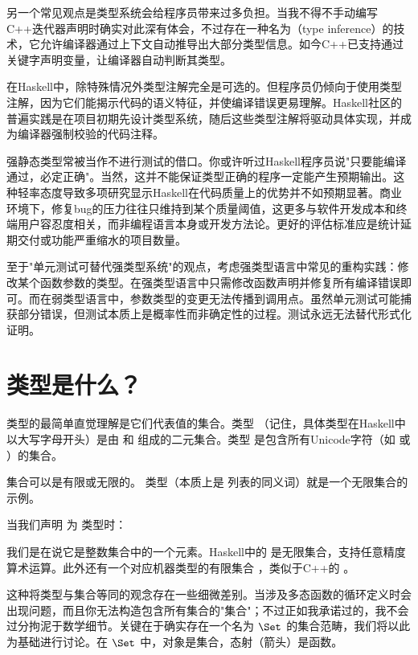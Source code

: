 另一个常见观点是类型系统会给程序员带来过多负担。当我不得不手动编写C++迭代器声明时确实对此深有体会，不过存在一种名为（type inference）的技术，它允许编译器通过上下文自动推导出大部分类型信息。如今C++已支持通过关键字声明变量，让编译器自动判断其类型。

在Haskell中，除特殊情况外类型注解完全是可选的。但程序员仍倾向于使用类型注解，因为它们能揭示代码的语义特征，并使编译错误更易理解。Haskell社区的普遍实践是在项目初期先设计类型系统，随后这些类型注解将驱动具体实现，并成为编译器强制校验的代码注释。\sloppy{}

强静态类型常被当作不进行测试的借口。你或许听过Haskell程序员说"只要能编译通过，必定正确"。当然，这并不能保证类型正确的程序一定能产生预期输出。这种轻率态度导致多项研究显示Haskell在代码质量上的优势并不如预期显著。商业环境下，修复bug的压力往往只维持到某个质量阈值，这更多与软件开发成本和终端用户容忍度相关，而非编程语言本身或开发方法论。更好的评估标准应是统计延期交付或功能严重缩水的项目数量。

至于"单元测试可替代强类型系统"的观点，考虑强类型语言中常见的重构实践：修改某个函数参数的类型。在强类型语言中只需修改函数声明并修复所有编译错误即可。而在弱类型语言中，参数类型的变更无法传播到调用点。虽然单元测试可能捕获部分错误，但测试本质上是概率性而非确定性的过程。测试永远无法替代形式化证明。

\section{类型是什么？}

类型的最简单直觉理解是它们代表值的集合。类型 （记住，具体类型在Haskell中以大写字母开头）是由  和  组成的二元集合。类型  是包含所有Unicode字符（如  或 ）的集合。

集合可以是有限或无限的。 类型（本质上是  列表的同义词）就是一个无限集合的示例。

当我们声明  为  类型时：

我们是在说它是整数集合中的一个元素。Haskell中的  是无限集合，支持任意精度算术运算。此外还有一个对应机器类型的有限集合 ，类似于C++的 。

这种将类型与集合等同的观念存在一些细微差别。当涉及多态函数的循环定义时会出现问题，而且你无法构造包含所有集合的"集合"；不过正如我承诺过的，我不会过分拘泥于数学细节。关键在于确实存在一个名为 $\Set$ 的集合范畴，我们将以此为基础进行讨论。在 $\Set$ 中，对象是集合，态射（箭头）是函数。

